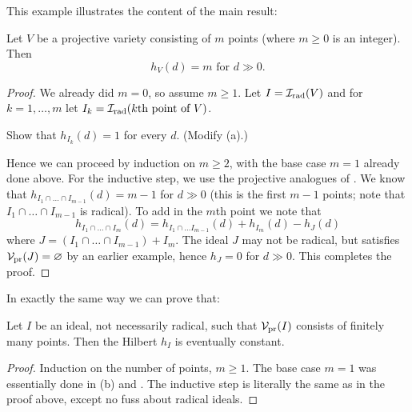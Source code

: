 This example illustrates the content of the main result:
\begin{theorem}
	Let $V$ be a projective variety consisting of $m$ points
	(where $m \ge 0$ is an integer).
	Then \[ h_V(d) = m \text{ for $d \gg 0$}. \]
\end{theorem}
\begin{proof}
	We already did $m = 0$, so assume $m \ge 1$.
	Let $I = \mathcal I_{\text{rad}}(V)$ and for $k=1,\dots,m$
	let $I_k = \mathcal I_{\text{rad}}(\text{$k$th point of $V$})$.
	\begin{exercise}
		Show that $h_{I_k} (d) = 1$ for every $d$.
		(Modify (a).)
		\label{ques:hilbert_always_one}
	\end{exercise}

	Hence we can proceed by induction on $m \ge 2$,
	with the base case $m=1$ already done above.
	For the inductive step,
	we use the projective analogues of .
	We know that $h_{I_1 \cap \dots \cap I_{m-1}}(d) = m-1$ for $d \gg 0$
	(this is the first $m-1$ points;
	note that $I_1 \cap \dots \cap I_{m-1}$ is radical).
	To add in the $m$th point we note that
	\[
		h_{I_1 \cap \dots \cap I_m}(d)
		= h_{I_1 \cap \dots I_{m-1}}(d) + h_{I_m}(d)
		- h_J(d)
	\]
	where $J = (I_1 \cap \dots \cap I_{m-1}) + I_m$.
	The ideal $J$ may not be radical, but satisfies $\mathcal V_{\text{pr}}(J) = \varnothing$
	by an earlier example, hence $h_J = 0$ for $d \gg 0$.
	This completes the proof.
\end{proof}
In exactly the same way we can prove that:
\begin{corollary}[$h_I$ eventually constant when $\dim \Vp(I) = 0$]
	Let $I$ be an ideal, not necessarily radical,
	such that $\mathcal V_{\text{pr}}(I)$ consists of finitely many points.
	Then the Hilbert $h_I$ is eventually constant.
\end{corollary}
\begin{proof}
	Induction on the number of points, $m \ge 1$.
	The base case $m = 1$ was essentially done in (b)
	and .
	The inductive step is literally the same as in the proof above,
	except no fuss about radical ideals.
\end{proof}

